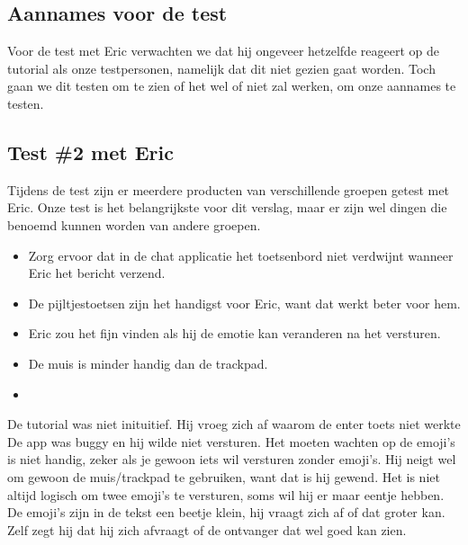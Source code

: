 \documentclass[12pt]{article}
\begin{document}
\subsection{Aannames voor de test}

Voor de test met Eric verwachten we dat hij ongeveer hetzelfde reageert op de tutorial als onze testpersonen, namelijk dat dit niet gezien gaat worden.
Toch gaan we dit testen om te zien of het wel of niet zal werken, om onze aannames te testen.

\subsection{Test \#2 met Eric}

Tijdens de test zijn er meerdere producten van verschillende groepen getest met Eric.
Onze test is het belangrijkste voor dit verslag, maar er zijn wel dingen die benoemd kunnen worden van andere groepen.

\begin{itemize}
	\item Zorg ervoor dat in de chat applicatie het toetsenbord niet verdwijnt wanneer Eric het bericht verzend.
	\item	De pijltjestoetsen zijn het handigst voor Eric, want dat werkt beter voor hem.
	\item Eric zou het fijn vinden als hij de emotie kan veranderen na het versturen.
	\item De muis is minder handig dan de trackpad.
	\item 
\end{itemize}


De tutorial was niet inituitief.
Hij vroeg zich af waarom de enter toets niet werkte 
De app was buggy en hij wilde niet versturen.
Het moeten wachten op de emoji's is niet handig, zeker als je gewoon iets wil versturen zonder emoji's.
Hij neigt wel om gewoon de muis/trackpad te gebruiken, want dat is hij gewend.
Het is niet altijd logisch om twee emoji's te versturen, soms wil hij er maar eentje hebben.
De emoji's zijn in de tekst een beetje klein, hij vraagt zich af of dat groter kan.
Zelf zegt hij dat hij zich afvraagt of de ontvanger dat wel goed kan zien.
\end{document}
